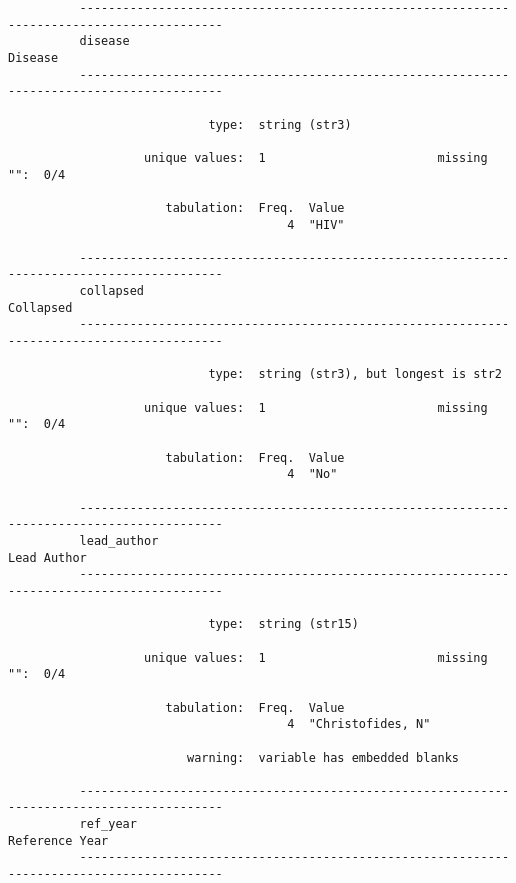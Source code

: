 \documentclass{article}
\begin{document}
\begin{verbatim}
          
          
          
          ------------------------------------------------------------------------------------------
          disease                                                                            Disease
          ------------------------------------------------------------------------------------------
          
                            type:  string (str3)
          
                   unique values:  1                        missing "":  0/4
          
                      tabulation:  Freq.  Value
                                       4  "HIV"
          
          ------------------------------------------------------------------------------------------
          collapsed                                                                        Collapsed
          ------------------------------------------------------------------------------------------
          
                            type:  string (str3), but longest is str2
          
                   unique values:  1                        missing "":  0/4
          
                      tabulation:  Freq.  Value
                                       4  "No"
          
          ------------------------------------------------------------------------------------------
          lead_author                                                                    Lead Author
          ------------------------------------------------------------------------------------------
          
                            type:  string (str15)
          
                   unique values:  1                        missing "":  0/4
          
                      tabulation:  Freq.  Value
                                       4  "Christofides, N"
          
                         warning:  variable has embedded blanks
          
          ------------------------------------------------------------------------------------------
          ref_year                                                                    Reference Year
          ------------------------------------------------------------------------------------------
          

\end{verbatim}
\end{document}
